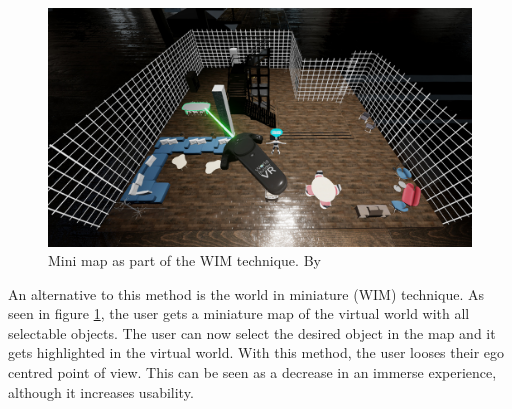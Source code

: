 \begin{figure}[h!]
  \includegraphics[width=14cm]{kapitel/mini-map.jpg}
  \centering
  \caption{Mini map as part of the WIM technique. By \cite{Arnowitz.2017}}
  \label{fig:minimap}
\end{figure}
An alternative to this method is the world in miniature (WIM) technique. As seen in figure \ref{fig:minimap}, the user gets a miniature map of the virtual world with all selectable objects. The user can now select the desired object in the map and it gets highlighted in the virtual world. With this method, the user looses their ego centred point of view. This can be seen as a decrease in an immerse experience, although it increases usability.

